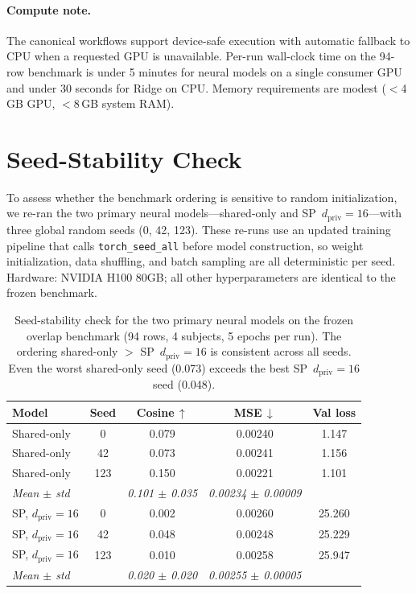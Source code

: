 \documentclass{article}
\begin{document}
\paragraph{Compute note.}
The canonical workflows support device-safe execution with automatic fallback to
CPU when a requested GPU is unavailable.  Per-run wall-clock time on the 94-row
benchmark is under 5 minutes for neural models on a single consumer GPU and
under 30 seconds for Ridge on CPU.  Memory requirements are modest
($<$4\,GB GPU, $<$8\,GB system RAM).

\section{Seed-Stability Check}
\label{app:seeds}

To assess whether the benchmark ordering is sensitive to random initialization,
we re-ran the two primary neural models---shared-only and
SP~$d_\mathrm{priv}\!=\!16$---with three global random seeds (0, 42, 123).
These re-runs use an updated training pipeline that calls
\texttt{torch\_seed\_all} before model construction, so weight initialization,
data shuffling, and batch sampling are all deterministic per seed.  Hardware:
NVIDIA H100 80GB; all other hyperparameters are identical to the frozen
benchmark.

\begin{table}[h]
  \centering
  \footnotesize
  \caption{Seed-stability check for the two primary neural models on the
  frozen overlap benchmark (94 rows, 4 subjects, 5 epochs per run).
  The ordering shared-only $>$ SP~$d_\mathrm{priv}\!=\!16$ is consistent
  across all seeds.  Even the worst shared-only seed (0.073) exceeds the
  best SP~$d_\mathrm{priv}\!=\!16$ seed (0.048).}
  \label{tab:seeds}
  \begin{tabular}{@{}lcccc@{}}
    \toprule
    Model & Seed & Cosine\,$\uparrow$ & MSE\,$\downarrow$ &
      Val loss \\
    \midrule
    Shared-only & 0   & 0.079 & 0.00240 & 1.147 \\
    Shared-only & 42  & 0.073 & 0.00241 & 1.156 \\
    Shared-only & 123 & 0.150 & 0.00221 & 1.101 \\
    \addlinespace[2pt]
    \textit{Mean $\pm$ std} & & \textit{0.101 $\pm$ 0.035}
      & \textit{0.00234 $\pm$ 0.00009} & \\
    \midrule
    SP, $d_\mathrm{priv}\!=\!16$ & 0   & 0.002 & 0.00260 & 25.260 \\
    SP, $d_\mathrm{priv}\!=\!16$ & 42  & 0.048 & 0.00248 & 25.229 \\
    SP, $d_\mathrm{priv}\!=\!16$ & 123 & 0.010 & 0.00258 & 25.947 \\
    \addlinespace[2pt]
    \textit{Mean $\pm$ std} & & \textit{0.020 $\pm$ 0.020}
      & \textit{0.00255 $\pm$ 0.00005} & \\
    \bottomrule
  \end{tabular}
\end{table}
\end{document}
